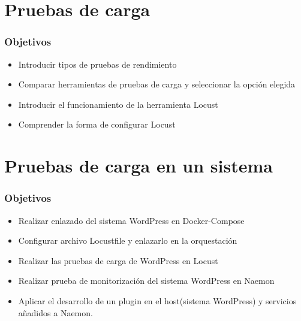 \documentclass{beamer}
\theoremstyle{plain}
\theoremstyle{definition}
\theoremstyle{plain}
\theoremstyle{definition}
\theoremstyle{remark}
\theoremstyle{definition}
\begin{document}
\section{Pruebas de carga} %
\begin{frame}
	
	\frametitle{Objetivos}
	\begin{itemize}
		\item Introducir tipos de pruebas de rendimiento
		\item Comparar herramientas de pruebas de carga y seleccionar la opción elegida
		\item Introducir el funcionamiento de la herramienta Locust
		\item Comprender la forma de configurar Locust 
	\end{itemize}
	
\end{frame}

\section{Pruebas de carga en un sistema} %
\begin{frame}
	
	\frametitle{Objetivos}
	\begin{itemize}
		\item Realizar enlazado del sistema WordPress en Docker-Compose
		\item Configurar archivo Locustfile y enlazarlo en la orquestación
		\item Realizar las pruebas de carga de WordPress en Locust
		\item Realizar prueba de monitorización del sistema WordPress en Naemon
		\item Aplicar el desarrollo de un plugin en el host(sistema WordPress) y servicios añadidos a Naemon.		
	\end{itemize}
	
\end{frame}
\end{document}
